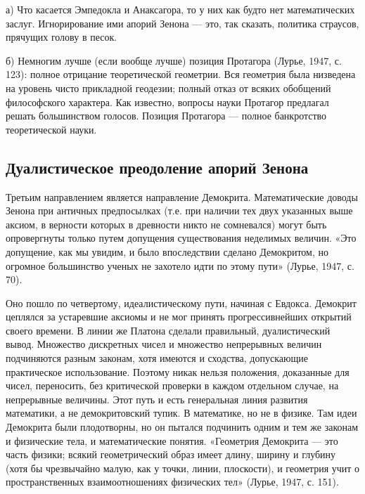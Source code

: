 а)  Что касается  Эмпедокла  и  Анаксагора, то  у  них  как будто  нет
математических заслуг.  Игнорирование ими  апорий Зенона ---  это, так
сказать, политика страусов, прячущих голову в песок.

б) Немногим лучше (если вообще  лучше) позиция Протагора (Лурье, 1947,
с. 123): полное отрицание  теоретической геометрии. Вся геометрия была
низведена на уровень чисто прикладной геодезии; полный отказ от всяких
обобщений философского характера. Как известно, вопросы науки Протагор
предлагал решать  большинством голосов.  Позиция Протагора  --- полное
банкротство теоретической науки.

\subsection{Дуалистическое преодоление апорий Зенона}

Третьим  направлением является  направление Демокрита.  Математические
доводы  Зенона  при  античных   предпосылках  (т.е.  при  наличии  тех
двух  указанных выше  аксиом,  в верности  которых  в древности  никто
не  сомневался)   могут  быть  опровергнуты  только   путем  допущения
существования неделимых величин. «Это допущение, как мы увидим, и было
впоследствии  сделано Демокритом,  но огромное  большинство ученых  не
захотело идти по этому пути» (Лурье, 1947, с. 70).

Оно  пошло по  четвертому, идеалистическому  пути, начиная  с Евдокса.
Демокрит   цеплялся   за  устаревшие   аксиомы   и   не  мог   принять
прогрессивнейших открытий  своего времени. В линии  же Платона сделали
правильный,  дуалистический   вывод.  Множество  дискретных   чисел  и
множество непрерывных величин подчиняются разным законам, хотя имеются
и  сходства,  допускающие  практическое использование.  Поэтому  никак
нельзя положения,  доказанные для  чисел, переносить,  без критической
проверки в каждом отдельном случае, на непрерывные величины. Этот путь
и  есть генеральная  линия  развития математики,  а не  демокритовский
тупик.  В  математике,  но  не  в  физике.  Там  идеи  Демокрита  были
плодотворны,  но  он  пытался  подчинить  одним и  тем  же  законам  и
физические тела,  и математические  понятия. «Геометрия  Демокрита ---
это часть  физики; всякий геометрический  образ имеет длину,  ширину и
глубину (хотя бы чрезвычайно малую,  как у точки, линии, плоскости), и
геометрия  учит о  пространственных  взаимоотношениях физических  тел»
(Лурье, 1947, с. 151).

